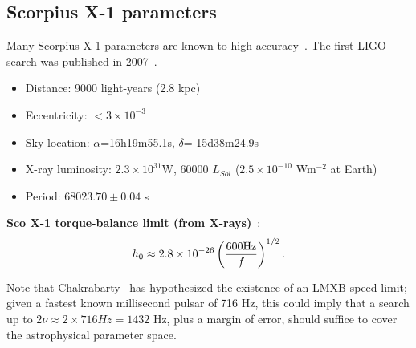 
\subsection{Scorpius X-1 parameters}
\label{scox1_parameters}

Many Scorpius X-1 parameters are known to high accuracy~\cite{Galloway2014}.
The first LIGO search was published in 2007~\cite{AbbottScoX12007}.

\begin{itemize}
\item Distance: 9000 light-years (2.8 kpc)
\item Eccentricity: $<3\times10^{-3}$
\item Sky location: $\alpha$=16h19m55.1s, $\delta$=-15d38m24.9s
\item X-ray luminosity: $2.3 \times10^{31}$W, 60000 $L_{Sol}$ ($2.5\times10^{-10}$ Wm$^{-2}$ at Earth)
\item Period: $68023.70 \pm 0.04$ s
\end{itemize}

\textbf{Sco X-1 torque-balance limit (from X-rays)}~\cite{Bildsten1998,GoetzThesis}:
\[
h_{0} \approx 2.8\times10^{-26}\left(\frac{600\textup{Hz}}{f}\right)^{1/2}.
\]


Note that Chakrabarty~\cite{Chakrabarty2003} has hypothesized the existence of an LMXB speed limit; given a fastest known millisecond pulsar of 716 Hz, this could imply that a search up to $2\nu \approx 2\times716 Hz = 1432$ Hz, plus a margin of error, should suffice to cover the astrophysical parameter space. 








